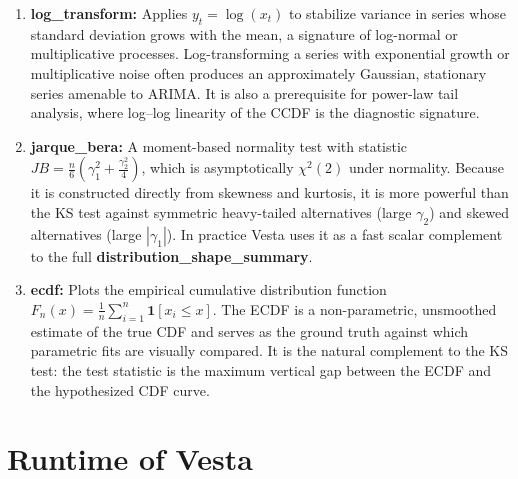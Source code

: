 \documentclass{article}
\newcommand{\method}{{\sc Vesta}}
\begin{document}
\begin{enumerate}
    \item \textbf{log\_transform:} Applies $y_t = \log(x_t)$ to stabilize variance in series whose standard deviation grows with the mean, a signature of log-normal or multiplicative processes. Log-transforming a series with exponential growth or multiplicative noise often produces an approximately Gaussian, stationary series amenable to ARIMA. It is also a prerequisite for power-law tail analysis, where log--log linearity of the CCDF is the diagnostic signature.

    \item \textbf{jarque\_bera:} A moment-based normality test with statistic $JB = \frac{n}{6}\left(\gamma_1^2 + \frac{\gamma_2^2}{4}\right)$, which is asymptotically $\chi^2(2)$ under normality. Because it is constructed directly from skewness and kurtosis, it is more powerful than the KS test against symmetric heavy-tailed alternatives (large $\gamma_2$) and skewed alternatives (large $|\gamma_1|$). In practice \method{} uses it as a fast scalar complement to the full \textbf{distribution\_shape\_summary}.

    \item \textbf{ecdf:} Plots the empirical cumulative distribution function $F_n(x) = \frac{1}{n}\sum_{i=1}^n \mathbf{1}[x_i \leq x]$. The ECDF is a non-parametric, unsmoothed estimate of the true CDF and serves as the ground truth against which parametric fits are visually compared. It is the natural complement to the KS test: the test statistic is the maximum vertical gap between the ECDF and the hypothesized CDF curve.

\end{enumerate}

\section{Runtime of \method{}}
\end{document}

